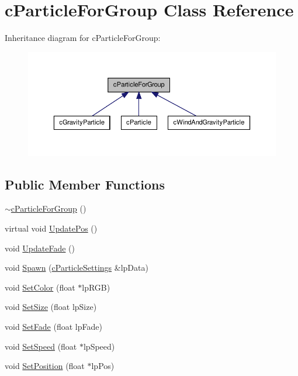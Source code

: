 \hypertarget{classc_particle_for_group}{
\section{cParticleForGroup Class Reference}
\label{classc_particle_for_group}
}


Inheritance diagram for cParticleForGroup:
\nopagebreak
\begin{figure}[H]
\begin{center}
\leavevmode
\includegraphics[width=382pt]{classc_particle_for_group__inherit__graph}
\end{center}
\end{figure}
\subsection*{Public Member Functions}
\begin{DoxyCompactItemize}
\item 
\hyperlink{classc_particle_for_group_aa7a8def5bda39f4e23564a809aa31f52}{$\sim$cParticleForGroup} ()
\item 
virtual void \hyperlink{classc_particle_for_group_a9862ab616c1588422e55ecf4ef66df23}{UpdatePos} ()
\item 
void \hyperlink{classc_particle_for_group_a3324120eebac84948e4178f728739cd5}{UpdateFade} ()
\item 
void \hyperlink{classc_particle_for_group_aa97d2bf5ca4bd161a71511b1fe7d6fa5}{Spawn} (\hyperlink{classc_particle_settings}{cParticleSettings} \&lpData)
\item 
void \hyperlink{classc_particle_for_group_a65aac942818f57357c4fae91c02d0f9b}{SetColor} (float $\ast$lpRGB)
\item 
void \hyperlink{classc_particle_for_group_adba747c94fec6cef320a6517e99e98b4}{SetSize} (float lpSize)
\item 
void \hyperlink{classc_particle_for_group_ae7f11761354fa6c9cb6c0bb276f7c1bd}{SetFade} (float lpFade)
\item 
void \hyperlink{classc_particle_for_group_a2c5b2c8db2eef075862e43f074a9ac0e}{SetSpeed} (float $\ast$lpSpeed)
\item 
void \hyperlink{classc_particle_for_group_a8c833188f4ea1f82f273b37dd81e33c6}{SetPosition} (float $\ast$lpPos)
\end{DoxyCompactItemize}
